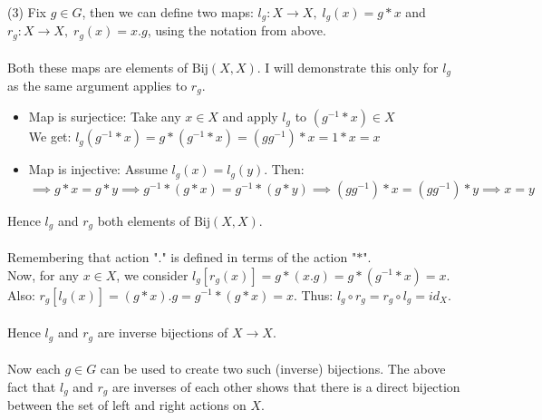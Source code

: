 \documentclass[12pt,a4paper]{article}
\begin{document}
\newpage
\noindent
(3) Fix $g \in G$, then we can define two maps: $l_g: X \to X, \; l_g(x) = g*x$ and $r_g: X \to X, \; r_g(x) = x.g$, using the notation from above.\\
\\
Both these maps are elements of $\text{Bij}(X, X)$.  I will demonstrate this only for $l_g$ as the same argument applies to $r_g$.
\begin{itemize}
    \item Map is surjectice:  Take any $x \in X$ and apply $l_g$ to $(g^{-1} * x) \in X$\\
    We get: $l_g(g^{-1} * x) = g*(g^{-1} * x) = (gg^{-1}) * x = 1 * x = x$
    \item Map is injective: Assume $l_g(x) = l_g(y)$. Then: \\
    $\implies g*x = g*y \implies g^{-1}*(g*x) = g^{-1}*(g*y) \implies (gg^{-1}) * x = (gg^{-1}) * y \implies x=y$
\end{itemize}
Hence $l_g$ and $r_g$ both elements of $\text{Bij}(X, X)$.\\
\\
Remembering that action "$.$" is defined in terms of the action "$*$".\\
Now, for any $x \in X$,  we consider $l_g[r_g(x)] = g*(x.g) = g*(g^{-1} * x) = x$. Also: $r_g[l_g(x)] = (g*x).g = g^{-1}*(g * x) = x$.
Thus: $l_g \circ r_g = r_g \circ l_g = id_X$.\\
\\
Hence $l_g$ and $r_g$ are inverse bijections of $X \to X$.\\
\\
Now each $g \in G$ can be used to create two such (inverse) bijections.  The above fact that $l_g$ and $r_g$ are inverses of each other shows that there is a direct 
bijection between the set of left and right actions on $X$.
\end{document}
